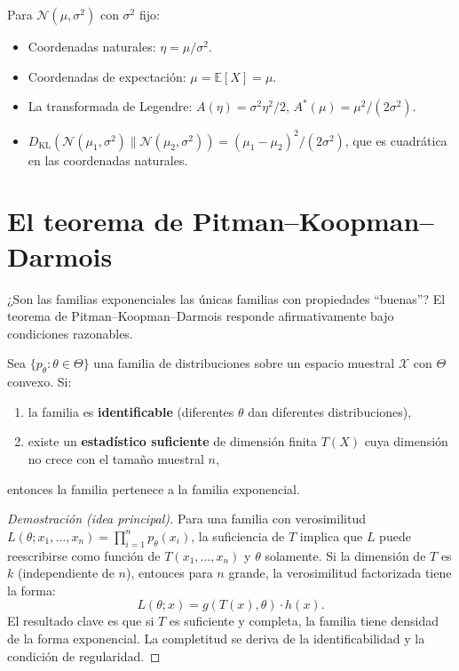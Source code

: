 \begin{example}
	Para $\mathcal{N}(\mu, \sigma^2)$ con $\sigma^2$ fijo:
	\begin{itemize}
		\item Coordenadas naturales: $\eta = \mu/\sigma^2$.
		\item Coordenadas de expectación: $\mu = \mathbb{E}[X] = \mu$.
		\item La transformada de Legendre: $A(\eta) = \sigma^2 \eta^2/2$, $A^*(\mu) = \mu^2/(2\sigma^2)$.
		\item $D_{\mathrm{KL}}(\mathcal{N}(\mu_1,\sigma^2) \| \mathcal{N}(\mu_2,\sigma^2)) = (\mu_1-\mu_2)^2/(2\sigma^2)$, que es cuadrática en las coordenadas naturales.
	\end{itemize}
\end{example}

\section{El teorema de Pitman--Koopman--Darmois}

¿Son las familias exponenciales las únicas familias con propiedades ``buenas''?  El teorema de Pitman--Koopman--Darmois responde afirmativamente bajo condiciones razonables.

\begin{theorem}
	Sea $\{p_\theta : \theta \in \Theta\}$ una familia de distribuciones sobre un espacio muestral $\mathcal{X}$ con $\Theta$ convexo.  Si:
	\begin{enumerate}
		\item la familia es \textbf{identificable} (diferentes $\theta$ dan diferentes distribuciones),
		\item existe un \textbf{estadístico suficiente} de dimensión finita $T(X)$ cuya dimensión no crece con el tamaño muestral $n$,
	\end{enumerate}
	entonces la familia pertenece a la familia exponencial.
\end{theorem}

\begin{proof}[Demostración (idea principal)]
	Para una familia con verosimilitud $L(\theta; x_1, \ldots, x_n) = \prod_{i=1}^n p_\theta(x_i)$, la suficiencia de $T$ implica que $L$ puede reescribirse como función de $T(x_1, \ldots, x_n)$ y $\theta$ solamente.  Si la dimensión de $T$ es $k$ (independiente de $n$), entonces para $n$ grande, la verosimilitud factorizada tiene la forma:
	\[
	L(\theta; x) = g(T(x), \theta) \cdot h(x).
	\]
	El resultado clave es que si $T$ es suficiente y completa, la familia tiene densidad de la forma exponencial.  La completitud se deriva de la identificabilidad y la condición de regularidad.
\end{proof}

